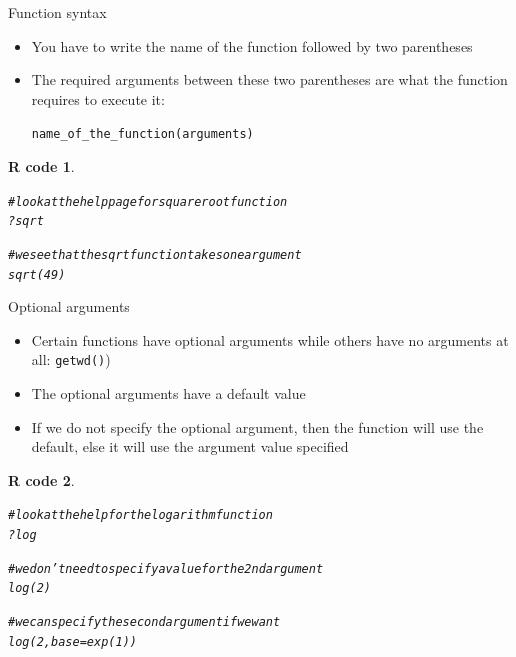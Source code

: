 \documentclass[11pt]{beamer}\usepackage[]{graphicx}\usepackage[]{color}
\makeatletter
\newcommand{\hlnum}[1]{\textcolor[rgb]{0.063,0.58,0.627}{#1}}%
\newcommand{\hlcom}[1]{\textcolor[rgb]{0.588,0.588,0.588}{#1}}%
\newcommand{\hlopt}[1]{\textcolor[rgb]{0.196,0.196,0.196}{#1}}%
\newcommand{\hlstd}[1]{\textcolor[rgb]{0.196,0.196,0.196}{#1}}%
\newcommand{\hlkwc}[1]{\textcolor[rgb]{0,0.631,0.314}{#1}}%
\newcommand{\hlkwd}[1]{\textcolor[rgb]{0.78,0.227,0.412}{#1}}%
\newenvironment{kframe}{%
 \def\at@end@of@kframe{}%
 \ifinner\ifhmode%
  \def\at@end@of@kframe{\end{minipage}}%
  \begin{minipage}{\columnwidth}%
 \fi\fi%
 \def\FrameCommand##1{\hskip\@totalleftmargin \hskip-\fboxsep
 \colorbox{shadecolor}{##1}\hskip-\fboxsep
     \hskip-\linewidth \hskip-\@totalleftmargin \hskip\columnwidth}%
 \MakeFramed {\advance\hsize-\width
   \@totalleftmargin\z@ \linewidth\hsize
   \@setminipage}}%
 {\par\unskip\endMakeFramed%
 \at@end@of@kframe}
\newenvironment{knitrout}{}{} %
\newtheorem{rcode}{R code}[section]
\newcommand{\code}[1]{\texttt{#1}}
\makeatother
\begin{document}
\begin{frame}[fragile]{Function syntax}
\begin{itemize}
 \setlength\itemsep{2em}
\item You have to write the name of the function followed by two parentheses
\pause \item The required arguments between these two parentheses are what the function requires to execute it:
\begin{center}
\code{name\_of\_the\_function(arguments)}
\end{center}
\end{itemize}
\pause 
\begin{knitrout}
\color{fgcolor}\begin{kframe}
\begin{rcode}\label{unnamed-chunk-10}\begin{alltt}
\hlcom{# look at the help page for square root function}
\hlopt{?}\hlstd{sqrt}

\hlcom{# we see that the sqrt function takes one argument}
\hlkwd{sqrt}\hlstd{(}\hlnum{49}\hlstd{)}
\end{alltt}
\end{rcode}\end{kframe}
\end{knitrout}

\end{frame}



\begin{frame}[fragile]{Optional arguments}
\begin{itemize}
 \setlength\itemsep{0.5em}
\item Certain functions have optional arguments while others have no arguments at all: \code{getwd()}) 
\pause \item The optional arguments have a default value 
\pause \item If we do not specify the optional argument, then the function will use the default, else it will use the argument value specified
\end{itemize}
\pause 

\begin{knitrout}\footnotesize
{}\color{fgcolor}\begin{kframe}
\begin{rcode}\label{unnamed-chunk-11}\begin{alltt}
\hlcom{# look at the help for the logarithm function}
\hlopt{?}\hlstd{log}

\hlcom{# we don't need to specify a value for the 2nd argument }
\hlkwd{log}\hlstd{(}\hlnum{2}\hlstd{)}

\hlcom{# we can specify the second argument if we want}
\hlkwd{log}\hlstd{(}\hlnum{2}\hlstd{,} \hlkwc{base} \hlstd{=} \hlkwd{exp}\hlstd{(}\hlnum{1}\hlstd{))}
\end{alltt}
\end{rcode}\end{kframe}
\end{knitrout}

\end{frame}
\end{document}
